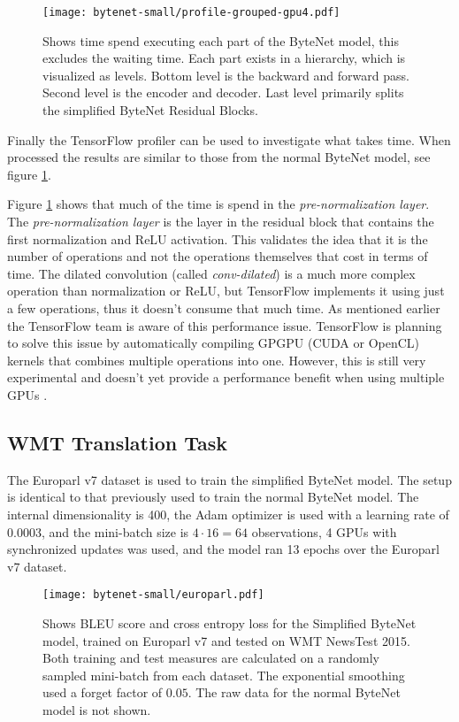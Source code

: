 \begin{figure}[h]
    \centering
    \texttt{[image: bytenet-small/profile-grouped-gpu4.pdf]}
    \caption{Shows time spend executing each part of the ByteNet model, this excludes the waiting time. Each part exists in a hierarchy, which is visualized as levels. Bottom level is the backward and forward pass. Second level is the encoder and decoder. Last level primarily splits the simplified ByteNet Residual Blocks.}
    \label{fig:result:simple-bytenet:profile-grouped}
\end{figure}

Finally the TensorFlow profiler can be used to investigate what takes time. When processed the results are similar to those from the normal ByteNet model, see figure \ref{fig:result:simple-bytenet:profile-grouped}.

Figure \ref{fig:result:simple-bytenet:profile-grouped} shows that much of the time is spend in the \textit{pre-normalization layer}. The \textit{pre-normalization layer} is the layer in the residual block that contains the first normalization and ReLU activation. This validates the idea that it is the number of operations and not the operations themselves that cost in terms of time. The dilated convolution (called \textit{conv-dilated}) is a much more complex operation than normalization or ReLU, but TensorFlow implements it using just a few operations, thus it doesn't consume that much time. As mentioned earlier the TensorFlow team is aware of this performance issue. TensorFlow is planning to solve this issue by automatically compiling GPGPU (CUDA or OpenCL) kernels that combines multiple operations into one. However, this is still very experimental and doesn't yet provide a performance benefit when using multiple GPUs \cite{google-xla}.

\clearpage
\subsection{WMT Translation Task}

The Europarl v7 dataset is used to train the simplified ByteNet model. The setup is identical to that previously used to train the normal ByteNet model. The internal dimensionality is 400, the Adam optimizer is used with a learning rate of 0.0003, and the mini-batch size is $4 \cdot 16 = 64$ observations, 4 GPUs with synchronized updates was used, and the model ran 13 epochs over the Europarl v7 dataset.

\begin{figure}[h]
    \centering
    \texttt{[image: bytenet-small/europarl.pdf]}
    \caption{Shows BLEU score and cross entropy loss for the Simplified ByteNet model, trained on Europarl v7 and tested on WMT NewsTest 2015. Both training and test measures are calculated on a randomly sampled mini-batch from each dataset. The exponential smoothing used a forget factor of $0.05$. The raw data for the normal ByteNet model is not shown.}
    \label{fig:result:bytenet-small:europarl}
\end{figure}

